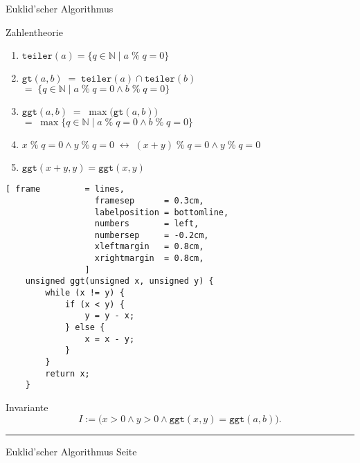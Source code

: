 \documentclass{slides}
\newcommand{\mod}{\;\texttt{\%}\;}
\newcounter{mypage}
\begin{document}
\begin{slide}{}
\normalsize

\begin{center}
Euklid'scher Algorithmus
\end{center}
\vspace*{0.5cm}

\footnotesize
Zahlentheorie
\begin{enumerate}
\item $\mathtt{teiler}(a) = \{ q \in \mathbb{N} \mid a \mod q = 0 \}$
\item $\mathtt{gt}(a,b) \;=\; \mathtt{teiler}(a) \cap \mathtt{teiler}(b)$ \\[0.2cm]
      \hspace*{2.17cm} $=\;\{ q \in \mathbb{N} \mid a \mod q = 0 \wedge b \mod q = 0 \}$
\item $\mathtt{ggt}(a,b) \;=\; \max\bigl(\mathtt{gt}(a,b)\bigr)$ \\[0.2cm]
      \hspace*{2.48cm} $=\; \max \bigl\{ q \in \mathbb{N} \mid a \mod q = 0 \wedge b \mod q = 0 \bigr\}$
\item $x \mod q = 0 \wedge y \mod q = 0 \;\leftrightarrow\; (x + y) \mod q = 0 \wedge y \mod q = 0$
\item $\mathtt{ggt}(x + y, y) = \mathtt{ggt}(x,y)$
\end{enumerate}

\begin{Verbatim}[ frame         = lines, 
                  framesep      = 0.3cm, 
                  labelposition = bottomline,
                  numbers       = left,
                  numbersep     = -0.2cm,
                  xleftmargin   = 0.8cm,
                  xrightmargin  = 0.8cm,
                ]
    unsigned ggt(unsigned x, unsigned y) {
        while (x != y) {
            if (x < y) {
                y = y - x;
            } else {
                x = x - y;
            }
        }
        return x;
    }
\end{Verbatim}

Invariante
\[ I := \bigl(x > 0 \wedge y > 0 \wedge \mathtt{ggt}(x,y) = \mathtt{ggt}(a,b) \bigr).
\]

\vspace*{\fill}
\tiny \addtocounter{mypage}{1}
\rule{17cm}{1mm}
Euklid'scher Algorithmus \hspace*{\fill} Seite 
\end{slide}
\end{document}
